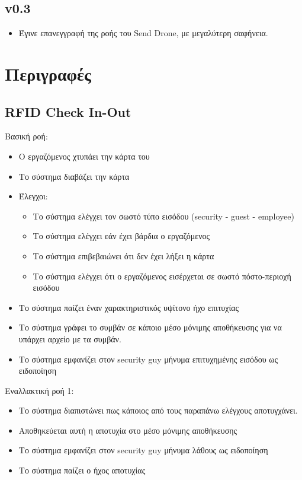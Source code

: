 \documentclass{article}
\begin{document}
\subsection{v0.3}
\begin{itemize}
    \item Έγινε επανεγγραφή της ροής του Send Drone, με μεγαλύτερη σαφήνεια.
\end{itemize}

\section{Περιγραφές}

\subsection{RFID Check In-Out}

\noindent Βασική ροή:
\begin{itemize}
    \item Ο εργαζόμενος χτυπάει την κάρτα του
    \item Το σύστημα διαβάζει την κάρτα
    \item Έλεγχοι: 
    \begin{itemize}
        \item Το σύστημα ελέγχει τον σωστό τύπο εισόδου (security - guest - employee)
        \item Το σύστημα ελέγχει εάν έχει βάρδια ο εργαζόμενος
        \item Το σύστημα επιβεβαιώνει ότι δεν έχει λήξει η κάρτα 
        \item Το σύστημα ελέγχει ότι ο εργαζόμενος εισέρχεται σε σωστό πόστο-περιοχή εισόδου
    \end{itemize}
    \item Το σύστημα παίζει έναν χαρακτηριστικός υψίτονο ήχο επιτυχίας
    \item Το σύστημα γράφει το συμβάν σε κάποιο μέσο μόνιμης αποθήκευσης για να υπάρχει αρχείο με τα συμβάν.
    \item Το σύστημα εμφανίζει στον security guy μήνυμα επιτυχημένης εισόδου ως ειδοποίηση
\end{itemize}

\noindent Εναλλακτική ροή 1: 
\begin{itemize}
    \item Το σύστημα διαπιστώνει πως κάποιος από τους παραπάνω ελέγχους αποτυγχάνει.
    \item Αποθηκεύεται αυτή η αποτυχία στο μέσο μόνιμης αποθήκευσης
    \item Το σύστημα εμφανίζει στον security guy μήνυμα λάθους ως ειδοποίηση
    \item Το σύστημα παίζει ο ήχος αποτυχίας
\end{itemize}
\end{document}
